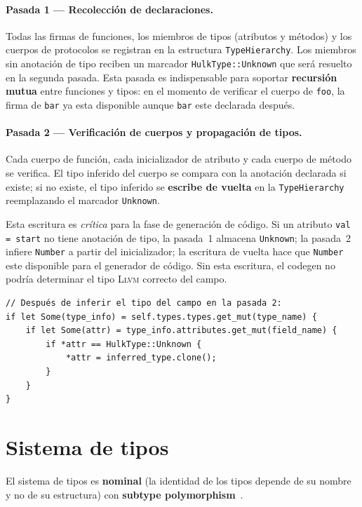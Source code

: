 \documentclass[11pt,a4paper,oneside,openany]{report}
\newcommand{\code}[1]{\texttt{#1}}
\newcommand{\llvm}{\textsc{Llvm}}
\begin{document}
\paragraph{Pasada 1 --- Recolección de declaraciones.}
Todas las firmas de funciones, los miembros de tipos (atributos y métodos) y los
cuerpos de protocolos se registran en la estructura \code{TypeHierarchy}. Los
miembros sin anotación de tipo reciben un marcador \code{HulkType::Unknown} que
será resuelto en la segunda pasada. Esta pasada es indispensable para soportar
\textbf{recursión mutua} entre funciones y tipos: en el momento de verificar el
cuerpo de \code{foo}, la firma de \code{bar} ya esta disponible aunque \code{bar}
este declarada después.

\paragraph{Pasada 2 --- Verificación de cuerpos y propagación de tipos.}
Cada cuerpo de función, cada inicializador de atributo y cada cuerpo de método se
verifica. El tipo inferido del cuerpo se compara con la anotación declarada si
existe; si no existe, el tipo inferido se \textbf{escribe de vuelta} en la
\code{TypeHierarchy} reemplazando el marcador \code{Unknown}.

Esta escritura es \emph{crítica} para la fase de generación de código. Si un atributo
\code{val = start} no tiene anotación de tipo, la pasada~1 almacena \code{Unknown}; la
pasada~2 infiere \code{Number} a partir del inicializador; la escritura de vuelta
hace que \code{Number} este disponible para el generador de código. Sin esta
escritura, el codegen no podría determinar el tipo \llvm{} correcto del campo.

\begin{lstlisting}[style=rustst, caption={Propagación del tipo inferido en la pasada
  semántica.}, label={lst:writeback}]
// Después de inferir el tipo del campo en la pasada 2:
if let Some(type_info) = self.types.types.get_mut(type_name) {
    if let Some(attr) = type_info.attributes.get_mut(field_name) {
        if *attr == HulkType::Unknown {
            *attr = inferred_type.clone();
        }
    }
}
\end{lstlisting}

\section{Sistema de tipos}

El sistema de tipos es \textbf{nominal} (la identidad de los tipos depende de su
nombre y no de su estructura) con \textbf{subtype polymorphism}~\cite{pierce2002}.
\end{document}

